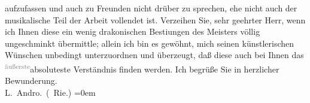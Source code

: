\begin{ledgroupsized}[t]{13cm}
                    aufzufassen und auch zu Freunden nicht drüber zu sprechen, ehe nicht auch der
                    musikalische Teil der Arbeit vollendet ist.\pend
           \pstart
           Verzeihen Sie, sehr geehrter Herr, wenn ich Ihnen diese ein wenig drakonischen
                        Besti{\geminationm}ungen des Meisters völlig ungeschminkt übermittle; allein ich
                    bin es gewöhnt, mich seinen künstlerischen Wünschen unbedingt unterzuordnen und
                    überzeugt, daß diese auch bei Ihnen das {\pb}\substVorne{}\textsuperscript{\textcolor{gray}{äußerste}}{\allowbreak}\substDazwischen{}absoluteste\substHinten{} Verständnis finden werden.\pend
           \pstart
           Ich begrüße Sie in herzlicher Bewunderung.{\\[\baselineskip]}\spacefill\mbox{L. Andro. (\label{K_L02569-1v}\label{K_L02569-1h} Rie.)}\pend
           \leftskip=0em{}\endnumbering{}\end{ledgroupsized}  \newcommand{\dateiname}{L02569}\newcommand{\titel}{Therese Rie-Andro an Arthur Schnitzler, 6. 2. 1912}\newcommand{\editorInnen}{Martin Anton Müller und Gerd-Hermann Susen}
      